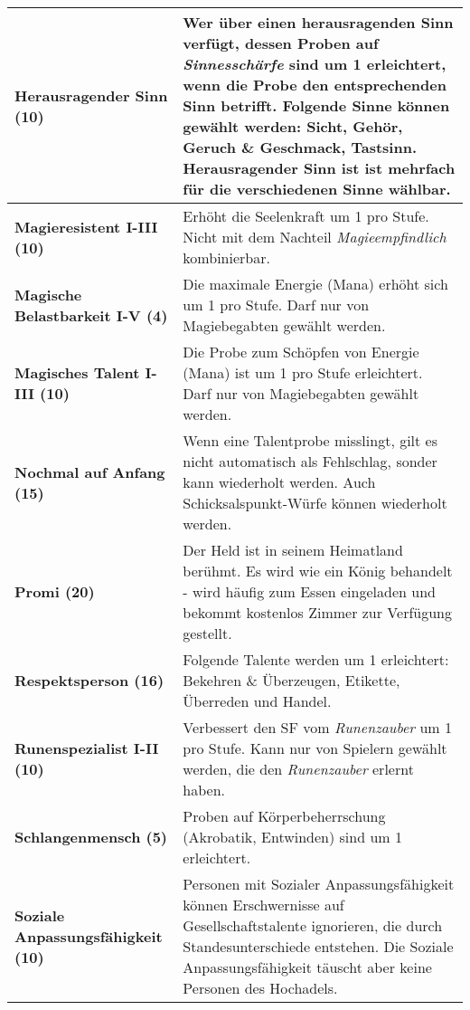 \begin{longtable}{|p{5cm}|p{11cm}|}
\textbf{Herausragender Sinn (10)} & Wer über einen herausragenden Sinn verfügt, dessen Proben auf \textit{Sinnesschärfe} sind um 1 erleichtert, wenn die Probe den entsprechenden Sinn betrifft. Folgende Sinne können gewählt werden: Sicht, Gehör, Geruch \& Geschmack, Tastsinn. Herausragender Sinn ist ist mehrfach für die verschiedenen Sinne wählbar. \\ \hline

\textbf{Magieresistent I-III (10)} & Erhöht die Seelenkraft um 1 pro Stufe. Nicht mit dem Nachteil \textit{Magieempfindlich} kombinierbar. \\ \hline

\textbf{Magische Belastbarkeit I-V (4)} & Die maximale Energie (Mana) erhöht sich um 1 pro Stufe. Darf nur von Magiebegabten gewählt werden. \\ \hline

\textbf{Magisches Talent I-III (10)} & Die Probe zum Schöpfen von Energie (Mana) ist um 1 pro Stufe erleichtert. Darf nur von Magiebegabten gewählt werden. \\ \hline 

\textbf{Nochmal auf Anfang (15)} & Wenn eine Talentprobe misslingt, gilt es nicht automatisch als Fehlschlag, sonder kann wiederholt werden. Auch Schicksalspunkt-Würfe können wiederholt werden. \\ \hline

\textbf{Promi (20)} & Der Held ist in seinem Heimatland berühmt. Es wird wie ein König behandelt - wird häufig zum Essen eingeladen und bekommt kostenlos Zimmer zur Verfügung gestellt. \\ \hline

\textbf{Respektsperson (16)} & Folgende Talente werden um 1 erleichtert: Bekehren \& Überzeugen, Etikette, Überreden und Handel. \\ \hline

\textbf{Runenspezialist I-II (10)} & Verbessert den SF vom \textit{Runenzauber} um 1 pro Stufe. Kann nur von Spielern gewählt werden, die den \textit{Runenzauber} erlernt haben. \\ \hline

\textbf{Schlangenmensch (5)} & Proben auf Körperbeherrschung (Akrobatik, Entwinden) sind um 1 erleichtert. \\ \hline

\textbf{Soziale Anpassungsfähigkeit (10)} & Personen mit Sozialer Anpassungsfähigkeit können Erschwernisse auf Gesellschaftstalente ignorieren, die durch Standesunterschiede entstehen. Die Soziale Anpassungsfähigkeit täuscht aber keine Personen des Hochadels. \\ \hline


\end{longtable}
